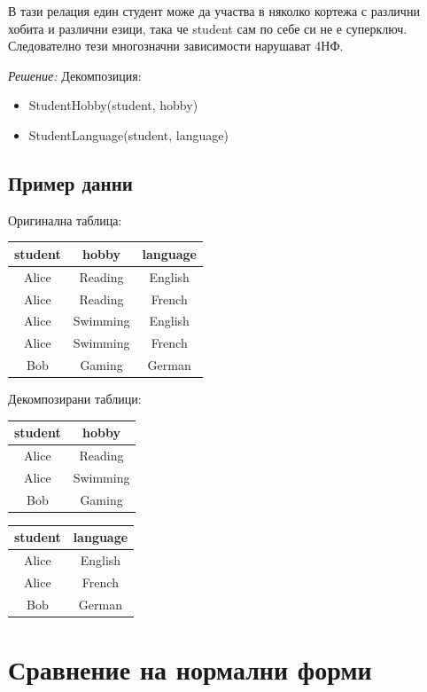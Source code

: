 \documentclass{scrartcl}
\begin{document}
\begin{FlushLeft}
В тази релация един студент може да участва в няколко кортежа с различни хобита и различни езици, така че student сам по себе си не е суперключ. Следователно тези многозначни зависимости нарушават 4НФ.

\textit{Решение:} Декомпозиция:
\begin{itemize}
    \item StudentHobby(student, hobby)
    \item StudentLanguage(student, language)
\end{itemize}

\subsection{Пример данни}

Оригинална таблица:

\begin{center}
\begin{tabular}{|c|c|c|}
\hline
student & hobby & language \\
\hline
Alice & Reading & English \\
Alice & Reading & French \\
Alice & Swimming & English \\
Alice & Swimming & French \\
Bob & Gaming & German \\
\hline
\end{tabular}
\end{center}

Декомпозирани таблици:

\begin{center}
\begin{tabular}{|c|c|}
\hline
student & hobby \\
\hline
Alice & Reading \\
Alice & Swimming \\
Bob & Gaming \\
\hline
\end{tabular}
\qquad
\begin{tabular}{|c|c|}
\hline
student & language \\
\hline
Alice & English \\
Alice & French \\
Bob & German \\
\hline
\end{tabular}
\end{center}

\section{Сравнение на нормални форми}


\end{FlushLeft}
\end{document}
